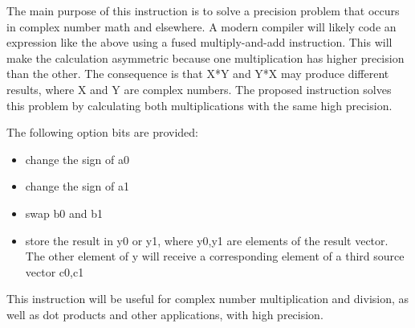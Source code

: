 \documentclass[forwardcom.tex]{subfiles}
\begin{document}
The main purpose of this instruction is to solve a precision problem that occurs in complex number math and elsewhere. A modern compiler will likely code an expression like the above using a fused multiply-and-add instruction. This will make the calculation asymmetric because one multiplication has higher precision than the other. The consequence is that X*Y and Y*X may produce different results, where X and Y are complex numbers. The proposed instruction solves this problem by calculating both multiplications with the same high precision.
\vv

The following option bits are provided:
\begin{itemize}
\item change the sign of a0
\item change the sign of a1
\item swap b0 and b1
\item store the result in y0 or y1, where y0,y1 are elements of the result vector. The other element of y will receive a corresponding element of a third source vector c0,c1
\end{itemize}
\vv

This instruction will be useful for complex number multiplication and division, as well as dot products and other applications, with high precision.
\vv

 
\end{document}
